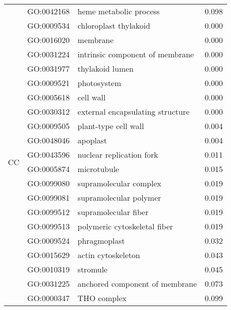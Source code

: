 \begin{longtable}{lllr}
   & GO:0042168 &                       heme metabolic process &         0.098 \\
\cline{1-4}
\multirow{20}{*}{CC} & GO:0009534 &                        chloroplast thylakoid &         0.000 \\
   & GO:0016020 &                                     membrane &         0.000 \\
   & GO:0031224 &              intrinsic component of membrane &         0.000 \\
   & GO:0031977 &                              thylakoid lumen &         0.000 \\
   & GO:0009521 &                                  photosystem &         0.000 \\
   & GO:0005618 &                                    cell wall &         0.000 \\
   & GO:0030312 &             external encapsulating structure &         0.000 \\
   & GO:0009505 &                         plant-type cell wall &         0.004 \\
   & GO:0048046 &                                     apoplast &         0.004 \\
   & GO:0043596 &                     nuclear replication fork &         0.011 \\
   & GO:0005874 &                                  microtubule &         0.015 \\
   & GO:0099080 &                       supramolecular complex &         0.019 \\
   & GO:0099081 &                       supramolecular polymer &         0.019 \\
   & GO:0099512 &                         supramolecular fiber &         0.019 \\
   & GO:0099513 &                 polymeric cytoskeletal fiber &         0.019 \\
   & GO:0009524 &                                 phragmoplast &         0.032 \\
   & GO:0015629 &                           actin cytoskeleton &         0.043 \\
   & GO:0010319 &                                     stromule &         0.045 \\
   & GO:0031225 &               anchored component of membrane &         0.073 \\
   & GO:0000347 &                                  THO complex &         0.099 \\
\cline{1-4}

\end{longtable}
